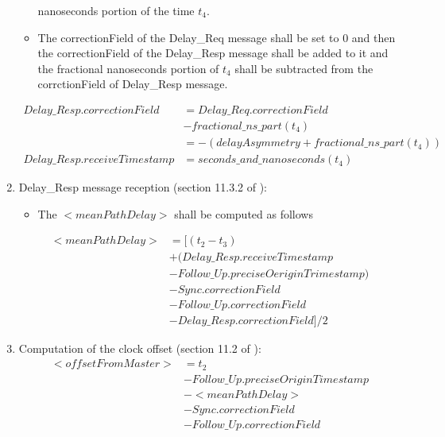 \documentclass[a4paper, 12pt]{article}
\begin{document}
\begin{enumerate}
\begin{itemize}
	    nanoseconds portion of the time $t_4$.
      \item The correctionField of the Delay\_Req message shall be set to 0 and then 
	    the correctionField of the Delay\_Resp message shall be added to it and
	    the fractional nanoseconds portion of $t_4$ shall be subtracted from the 
	    corrctionField of Delay\_Resp message.
    \end{itemize}
	  \begin{align}
	    \label{eq:delay_resp_tx}
	    Delay\_Resp.correctionField 	&= Delay\_Req.correctionField \\
					  &- fractional\_ns\_part(t_4)\\
	  \nonumber	 		&= -(delayAsymmetry + fractional\_ns\_part(t_4)) \\
	    Delay\_Resp.receiveTimestamp 	&= seconds\_and\_nanoseconds(t_4)
	  \end{align}
  \item Delay\_Resp message reception (section 11.3.2 of \cite{IEEE1588}):
    \begin{itemize}
      \item The $<meanPathDelay>$ shall be computed as follows
    \end{itemize}
	  \begin{align}
	    \label{eq:meanPathDelay}
	    <meanPathDelay> &=[(t_2 - t_3) \\
	  \nonumber	  &+ (Delay\_Resp.receiveTimestamp \\
	  \nonumber	  &- Follow\_Up.preciseOeriginTrimestamp)\\ 
	  \nonumber	  &- Sync.correctionField \\
	  \nonumber	  &- Follow\_Up.correctionField \\
	  \nonumber	  &- Delay\_Resp.correctionField]/2
	  \end{align}
  \item Computation of the clock offset  (section 11.2 of \cite{IEEE1588}):
	  \begin{align}
	    \label{eq:offset}
	    <offsetFromMaster> &=t_2 \\
	  \nonumber	  &- Follow\_Up.preciseOriginTimestamp \\
	  \nonumber	  &- <meanPathDelay> \\
	  \nonumber	  &- Sync.correctionField \\
	  \nonumber	  &- Follow\_Up.correctionField 
	  \end{align}
\end{enumerate}
\end{document}
